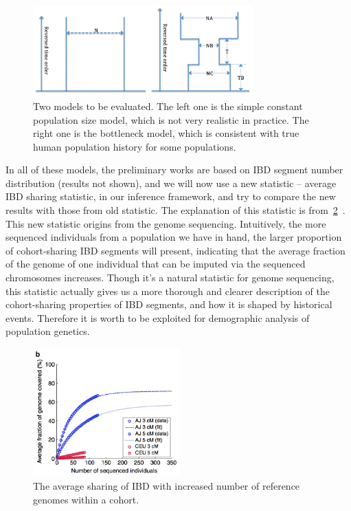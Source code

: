 \documentclass{bioinfo}
\begin{document}
\begin{figure}[h]
\centerline{\includegraphics[width=240pt, height=100pt]{model}}
\caption{Two models to be evaluated. The left one is the simple constant population size model, which is not very realistic in practice. The right one is the bottleneck model, which is consistent with true human population history for some populations.}\label{fig:model}
\end{figure}

In all of these models, the preliminary works are based on IBD segment number distribution (results not shown), and we will now use a new statistic -- average IBD sharing statistic, in our inference framework, and try to compare the new results with those from old statistic. The explanation of this statistic is from~\ref{fig:newstats}~\cite{Carmi2014}. This new statistic origins from the genome sequencing. Intuitively, the more sequenced individuals from a population we have in hand, the larger proportion of cohort-sharing IBD segments will present, indicating that the average fraction of the genome of one individual that can be imputed via the sequenced chromosomes increases. Though it's a natural statistic for genome sequencing, this statistic actually gives us a more thorough and clearer description of the cohort-sharing properties of IBD segments, and how it is shaped by historical events. Therefore it is worth to be exploited for demographic analysis of population genetics.


\begin{figure}[h]
\centerline{\includegraphics[width=160pt, height=140pt]{NewStats}}
\caption{The average sharing of IBD with increased number of reference genomes within a cohort.}\label{fig:newstats}
\end{figure}
\end{document}
